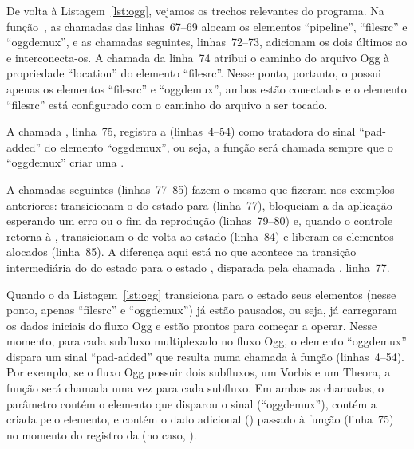 \documentclass{SBCbookchapter}
\begin{document}
De volta à Listagem~\ref{lst:ogg}, vejamos os trechos relevantes do
programa.  Na função~, as chamadas das linhas~67--69 alocam os
elementos ``pipeline'', ``filesrc'' e ``oggdemux'', e as chamadas seguintes,
linhas~72--73, adicionam os dois últimos ao  e interconecta-os.
A chamada da linha~74 atribui o caminho do arquivo Ogg à propriedade
``location'' do elemento ``filesrc''.  Nesse ponto, portanto, o
 possui apenas os elementos ``filesrc'' e ``oggdemux'', ambos
estão conectados e o elemento ``filesrc'' está configurado com o caminho do
arquivo a ser tocado.

A chamada , linha~75, registra a 
 (linhas~4--54) como tratadora do sinal ``pad-added'' do
elemento ``oggdemux'', ou seja, a função  será chamada
sempre que o ``oggdemux'' criar uma .

A chamadas seguintes (linhas~77--85) fazem o mesmo que fizeram nos exemplos
anteriores: transicionam o  do estado  para
 (linha~77), bloqueiam a  da aplicação esperando um
erro ou o fim da reprodução (linhas~79--80) e, quando o controle retorna à
, transicionam o  de volta ao estado 
(linha~84) e liberam os elementos alocados (linha~85).  A diferença aqui
está no que acontece na transição intermediária do  do estado
 para o estado , disparada pela chamada
, linha~77.

Quando o  da Listagem~\ref{lst:ogg} transiciona para o estado
 seus elementos (nesse ponto, apenas ``filesrc'' e ``oggdemux'')
já estão pausados, ou seja, já carregaram os dados iniciais do fluxo Ogg e
estão prontos para começar a operar.  Nesse momento, para cada subfluxo
multiplexado no fluxo Ogg, o elemento ``oggdemux'' dispara um sinal
``pad-added'' que resulta numa chamada à função 
(linhas~4--54).  Por exemplo, se o fluxo Ogg possuir dois subfluxos, um
Vorbis e um Theora, a função  será chamada uma vez para cada
subfluxo.  Em ambas as chamadas, o parâmetro  contém o elemento que
disparou o sinal (``oggdemux''),  contém a 
criada pelo elemento, e  contém o dado adicional ()
passado à função  (linha~75) no momento do registro da
 (no caso, ).
\end{document}
